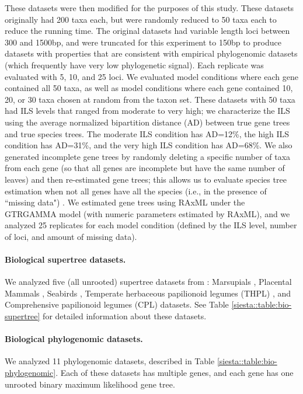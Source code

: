 These datasets were then modified for the purposes of this study. These datasets originally had 200 taxa each, but were randomly reduced to 50 taxa each to reduce the running time. 
The original datasets had variable length loci between 300 and 1500bp, and were truncated for this experiment to 150bp to produce datasets with properties that are consistent with empirical phylogenomic datasets (which frequently have very low phylogenetic signal). 
Each replicate was evaluated with 5, 10, and 25 loci. 
We evaluated model conditions where each gene contained all 50 taxa, as well as model conditions where each gene contained 10, 20, or 30 taxa chosen at random from the taxon set.
These datasets with 50 taxa had ILS levels that ranged from moderate to very high;  we characterize the ILS using the average normalized bipartition distance (AD) between true gene trees and true species trees.
The moderate ILS condition has AD=12\%, the high ILS condition has AD=31\%, and the very high ILS condition has AD=68\%.
We also generated incomplete gene trees by randomly deleting a specific number of taxa from each gene (so that all genes are incomplete but have the same number of leaves) and then re-estimated gene trees; this allows us to evaluate species tree estimation when not all genes have all the species (i.e., in the presence of ``missing data") \cite{MolloyWarnow2017}. 
We estimated gene trees  using RAxML \cite{Stamatakis2014} under the GTRGAMMA model (with numeric parameters estimated by RAxML), and we analyzed 25 replicates for each model condition (defined by the ILS level, number of loci, and amount of missing data).


\paragraph{Biological supertree datasets. }


We analyzed five (all unrooted) supertree datasets from \cite{smidgen}:  
 Marsupials \cite{marsupial}, Placental Mammals \cite{placental},
Seabirds \cite{kennedy2002seabird}, 
Temperate herbaceous papilionoid legumes (THPL) \cite{THPL},  and 
Comprehensive papilionoid legumes (CPL) \cite{cpl} datasets.
See Table \ref{siesta::table:bio-supertree} for detailed information about these datasets. 
 
 


\paragraph{Biological phylogenomic datasets. }
We analyzed 11 phylogenomic datasets, described in Table  \ref{siesta::table:bio-phylogenomic}.
Each of these datasets has multiple genes,  and
each gene has one unrooted binary maximum likelihood gene tree.


